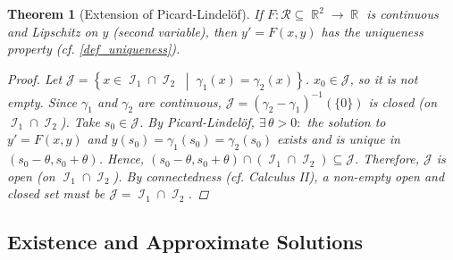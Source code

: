 \documentclass[12pt]{article}
\newcommand{\set}[2]{\left\{{#1}\;\middle|\;{#2}\right\}}
\newcommand{\Exist}[1]{\exists\,{#1}:}
\DeclareMathOperator{\R}{\mathbb{R}}
\DeclareMathOperator{\I}{\mathcal{I}}
\newtheorem{theorem}{Theorem}[subsection]
\begin{document}
\begin{theorem}[Extension of Picard-Lindelöf]
  \label{uniqueness_picard}
  If $F:\mathcal{R}\subseteq \R^2\to\R$ is continuous and Lipschitz on $y$ (second variable), then $y'=F(x,y)$ has the uniqueness property (cf. \ref{def_uniqueness}).
  \begin{proof}
    Let $\mathcal{J}=\set{x\in\I_1\cap\I_2}{\gamma_1(x)=\gamma_2(x)}$. $x_0\in\mathcal{J}$, so it is not empty. Since $\gamma_1$ and $\gamma_2$ are continuous, $\mathcal{J}=(\gamma_2-\gamma_1)^{-1}(\{0\})$ is closed (on $\I_1\cap\I_2$). Take $s_0\in\mathcal{J}$. By Picard-Lindelöf, $\Exist{\theta>0}$ the solution to $y'=F(x,y)$ and $y(s_0)=\gamma_1(s_0)=\gamma_2(s_0)$ exists and is unique in $(s_0-\theta,s_0+\theta)$. Hence, $(s_0-\theta,s_0+\theta)\cap(\I_1\cap\I_2)\subseteq\mathcal{J}$. Therefore, $\mathcal{J}$ is open (on $\I_1\cap\I_2$). By connectedness (cf. Calculus II), a non-empty open and closed set must be $\mathcal{J}=\I_1\cap\I_2$.
  \end{proof}
\end{theorem}

\pagebreak

\subsection{Existence and Approximate Solutions}
\end{document}
